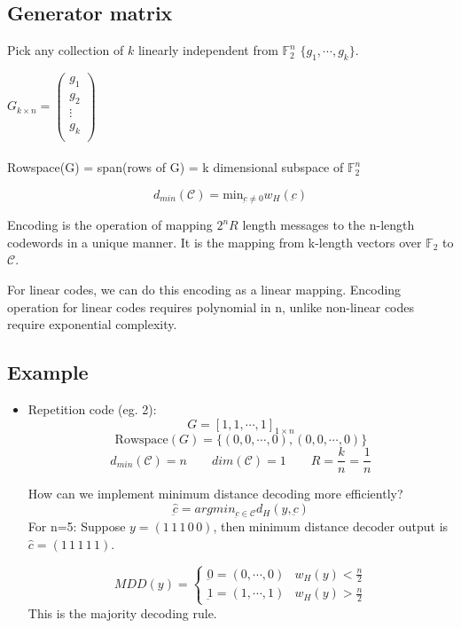 \documentclass{article}
\begin{document}
\subsection{Generator matrix}

Pick any collection of $k$ linearly independent from $\mathbb{F}_2^n$ $\{ g_1,\cdots, g_k\}$.


$ G_{k \times n}=
\begin{pmatrix}
g_1 \\
g_2 \\
\vdots \\
g_k \\
\end{pmatrix}$
\\
\\
Rowspace(G) = span(rows of G) = k dimensional subspace of $\mathbb{F}_2^n$

$$ d_{min}(\mathscr{C})= \text{min}_{\underbar{c} \neq 0}w_H (\underbar{c})$$

Encoding is the operation of mapping $2^nR$ length messages to the n-length codewords in a unique manner. It is the mapping from k-length vectors over $\mathbb{F}_2$ to $\mathscr{C}$.

For linear codes, we can do this encoding as a linear mapping.
Encoding operation for linear codes requires polynomial in n, unlike non-linear codes require exponential complexity.

\subsection{Example}

\begin{itemize}
    \item Repetition code (eg. 2):
    $$ G=   [1,1,\cdots,1]_{1 \times n}$$
    $$ \text{Rowspace}(G)= \{ (0,0,\cdots,0),(0,0,\cdots,0)\}$$
    $$ d_{min}(\mathscr{C})= n \qquad dim(\mathscr{C})=1 \qquad R= \frac{k}{n}= \frac{1}{n}$$

    How can we implement minimum distance decoding more efficiently?
    $$ \hat{\underbar{c}}= argmin_{\underbar{c} \in \mathscr{C}} d_H(y,\underbar{c})$$
    For n=5:
    Suppose $y=(1\,1\,1\,0\,0)$, then minimum distance decoder output is $\hat{c}=(1\,1\,1\,1\,1)$.

    $$ MDD(y)= \begin{cases}
      \underbar{0}=(0,\cdots,0) & w_H(y)<\frac{n}{2} \\
      \underbar{1}=(1,\cdots,1) & w_H(y) > \frac{n}{2}
   \end{cases}$$
   This is the majority decoding rule.
\end{itemize}
\end{document}
